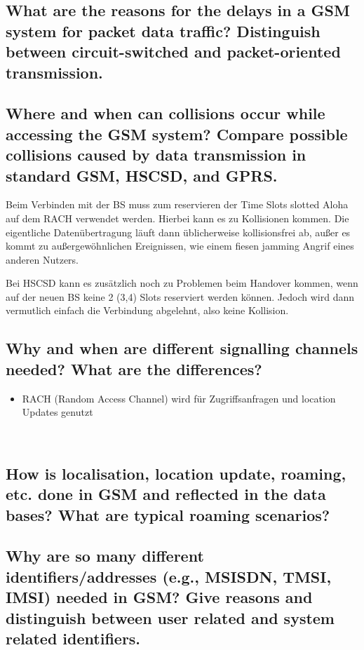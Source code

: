 \subsection{What are the reasons for the delays in a GSM system for packet data traffic? Distinguish between circuit-switched and packet-oriented transmission.}

\subsection{Where and when can collisions occur while accessing the GSM system? Compare possible collisions caused by data transmission in standard GSM, HSCSD, and GPRS.}
Beim Verbinden mit der BS muss zum reservieren der Time Slots slotted Aloha auf dem RACH verwendet werden. Hierbei kann es zu Kollisionen kommen. Die eigentliche Datenübertragung läuft dann üblicherweise kollisionsfrei ab, außer es kommt zu außergewöhnlichen Ereignissen, wie einem fiesen jamming Angrif eines anderen Nutzers.

Bei HSCSD kann es zusätzlich noch zu Problemen beim Handover kommen, wenn auf der neuen BS keine 2 (3,4) Slots reserviert werden können. Jedoch wird dann vermutlich einfach die Verbindung abgelehnt, also keine Kollision. 


\subsection{Why and when are different signalling channels needed? What are the differences?}
\begin{itemize}
\item RACH (Random Access Channel) wird für Zugriffsanfragen und location Updates genutzt

\
\end{itemize}

\subsection{How is localisation, location update, roaming, etc. done in GSM and reflected in the data bases? What are typical roaming scenarios?}



\subsection{Why are so many different identifiers/addresses (e.g., MSISDN, TMSI, IMSI) needed in GSM? Give reasons and distinguish between user related and system related identifiers.}

